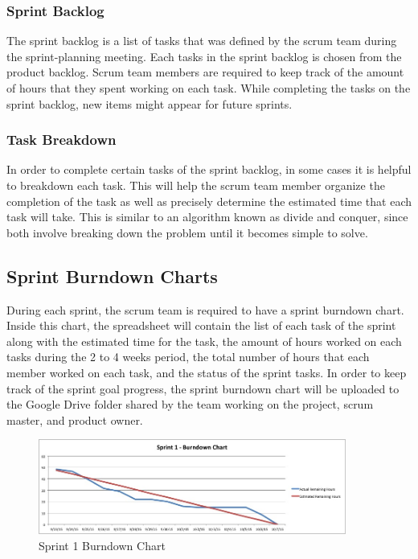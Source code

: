 \subsubsection{Sprint Backlog}
The sprint backlog is a list of tasks that was defined by the scrum team during the sprint-planning meeting. Each tasks in the sprint backlog is chosen from the product backlog. Scrum team members are required to keep track of the amount of hours that they spent working on each task. While completing the tasks on the sprint backlog, new items might appear for future sprints.

\subsubsection{Task Breakdown}
In order to complete certain tasks of the sprint backlog, in some cases it is helpful to breakdown each task. This will help the scrum team member organize the completion of the task as well as precisely determine the estimated time that each task will take. This is similar to an algorithm known as divide and conquer, since both involve breaking down the problem until it becomes simple to solve.

\subsection{Sprint Burndown Charts}
During each sprint, the scrum team is required to have a sprint burndown chart. Inside this chart, the spreadsheet will contain the list of each task of the sprint along with the estimated time for the task, the amount of hours worked on each tasks during the 2 to 4 weeks period, the total number of hours that each member worked on each task, and the status of the sprint tasks. In order to keep track of the sprint goal progress, the sprint burndown chart will be uploaded to the Google Drive folder shared by the team working on the project, scrum master, and product owner. 

\begin{figure}[h!]
	\centering
	\includegraphics[width=0.90\textwidth]{images/chart}
	\caption{Sprint 1 Burndown Chart}
\end{figure}

